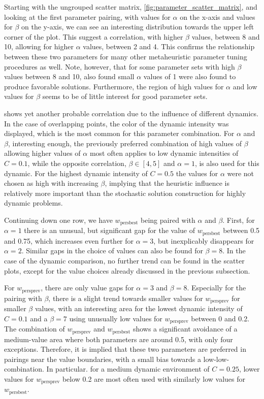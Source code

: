 Starting with the ungrouped scatter matrix, \cref{fig:parameter_scatter_matrix}, and looking at the first parameter pairing, with values for $\alpha$ on the x-axis and values for $\beta$ on the y-axis, we can see an interesting distribution towards the upper left corner of the plot. This suggest a correlation, with higher $\beta$ values, between 8 and 10, allowing for higher $\alpha$ values, between 2 and 4. This confirms the relationship between these two parameters for many other metaheuristic parameter tuning procedures as well. Note, however, that for some parameter sets with high $\beta$ values between 8 and 10, also found small $\alpha$ values of 1 were also found to produce favorable solutions. Furthermore, the region of high values for $\alpha$ and low values for $\beta$ seems to be of little interest for good parameter sets. 

 shows yet another probable correlation due to the influence of different dynamics. In the case of overlapping points, the color of the dynamic intensity was displayed, which is the most common for this parameter combination.
For $\alpha$ and $\beta$, interesting enough, the previously preferred combination of high values of $\beta$ allowing higher values of $\alpha$ most often applies to low dynamic intensities of $C=0.1$, while the opposite correlation, $\beta \in [4,5]$ and $\alpha = 1$, is also used for this dynamic. For the highest dynamic intensity of $C=0.5$ the values for $\alpha$ were not chosen as high with increasing $\beta$, implying that the heuristic influence is relatively more important than the stochastic solution construction for highly dynamic problems.

Continuing down one row, we have $w_{\text{persbest}}$ being paired with $\alpha$ and $\beta$. First, for $\alpha=1$ there is an unusual, but significant gap for the value of $w_{\text{persbest}}$ between 0.5 and 0.75, which increases even further for $\alpha=3$, but inexplicably disappears for $\alpha=2$. Similar gaps in the choice of values can also be found for $\beta = 8$. In the case of the dynamic comparison, no further trend can be found in the scatter plots, except for the value choices already discussed in the previous subsection.

For $w_{\text{persprev}}$, there are only value gaps for $\alpha = 3$ and $\beta = 8$. Especially for the pairing with $\beta$, there is a slight trend towards smaller values for $w_{\text{persprev}}$ for smaller $\beta$ values, with an interesting area for the lowest dynamic intensity of $C=0.1$ and a $\beta = 7$ using unusually low values for $w_{\text{persprev}}$ between 0 and 0.2. The combination of $w_{\text{persprev}}$ and $w_{\text{persbest}}$ shows a significant avoidance of a medium-value area where both parameters are around 0.5, with only four exceptions. Therefore, it is implied that these two parameters are preferred in pairings near the value boundaries, with a small bias towards a low-low-combination. In particular. for a medium dynamic environment of $C=0.25$, lower values for $w_{\text{persprev}}$ below 0.2 are most often used with similarly low values for $w_{\text{persbest}}$.

